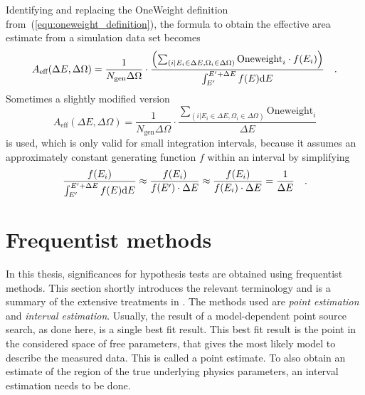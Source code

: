 Identifying and replacing the OneWeight definition from~(\ref{equ:oneweight_definition}), the formula to obtain the effective area estimate from a simulation data set becomes
\begin{equation}
  A_\text{eff}(\Delta E, \Delta \Omega) =
    \frac{1}{N_\text{gen}\Delta\Omega}\cdot
    \frac{\left(
            \sum_{(i|E_i\in\Delta E, \Omega_i\in\Delta\Omega)}
            \text{Oneweight}_i \cdot f(E_i)
          \right)}
          {\int_{E'}^{E'+\Delta E}f(E)\mathrm{d}E}
  \quad\text{.}
\end{equation}
Sometimes a slightly modified version
\begin{equation}
  A_\text{eff}(\Delta E, \Delta \Omega) =
    \frac{1}{N_\text{gen}\Delta\Omega}\cdot
    \frac{\sum_{(i|E_i\in\Delta E, \Omega_i\in\Delta\Omega)}
          \text{Oneweight}_i}
         {\Delta E}
\end{equation}
is used, which is only valid for small integration intervals, because it assumes an approximately constant generating function $f$ within an interval by simplifying
\begin{equation}
  \frac{f(E_i)}{\int_{E'}^{E'+\Delta E}f(E)\mathrm{d}E}
  \approx \frac{f(E_i)}{f(E')\cdot\Delta E}
  \approx \frac{f(E_i)}{f(E_i)\cdot\Delta E}
  = \frac{1}{\Delta E}
  \quad\text{.}
\end{equation}


\section{Frequentist methods}
  \label{chp:pointsource_frequentist}
In this thesis, significances for hypothesis tests are obtained using frequentist methods.
This section shortly introduces the relevant terminology and is a summary of the extensive treatments in \cite{casella2002statistical,blobel2013statistische,barlow1989statistics}.
The methods used are \emph{point estimation} and \emph{interval estimation}.
Usually, the result of a model-dependent point source search, as done here, is a single best fit result.
This best fit result is the point in the considered space of free parameters, that gives the most likely model to describe the measured data.
This is called a point estimate.
To also obtain an estimate of the region of the true underlying physics parameters, an interval estimation needs to be done.


